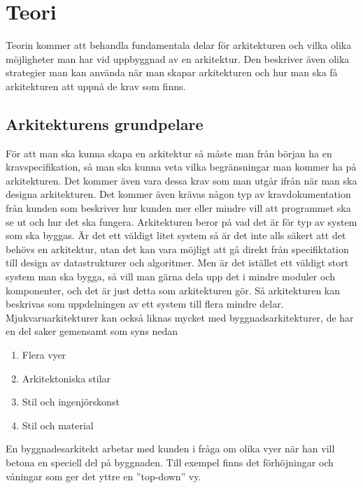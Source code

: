 \section{Teori}
Teorin kommer att behandla fundamentala delar för arkitekturen och vilka olika möjligheter man har vid uppbyggnad av en arkitektur. Den beskriver även olika strategier man kan använda när man skapar arkitekturen och hur man ska få arkitekturen att uppnå de krav som finns.

\subsection{Arkitekturens grundpelare}
För att man ska kunna skapa en arkitektur så måste man från början ha en kravspecifikation, så man ska kunna veta vilka begränsningar man kommer ha på arkitekturen. Det kommer även vara dessa krav som man utgår ifrån när man ska designa arkitekturen. \cite[s. 223]{set}
\newline
\newline
Det kommer även krävas någon typ av kravdokumentation från kunden som beskriver hur kunden mer eller mindre vill att programmet ska se ut och hur det ska fungera. \cite[s. 223]{set}
\newline
\newline
Arkitekturen beror på vad det är för typ av system som ska byggas. Är det ett väldigt litet system så är det inte alls säkert att det behövs en arkitektur, utan det kan vara möjligt att gå direkt från specifiktation till design av datastrukturer och algoritmer. Men är det istället ett väldigt stort system man ska bygga, så vill man gärna dela upp det i mindre moduler och komponenter, och det är just detta som arkitekturen gör. Så arkitekturen kan beskrivas som uppdelningen av ett system till flera mindre delar. \cite[s. 223]{set}
\newline
\newline
Mjukvaruarkitekturer kan också liknas mycket med byggnadsarkitekturer, de har en del saker gemensamt som syns nedan
\begin{enumerate}
	\item Flera vyer
	\item Arkitektoniska stilar
	\item Stil och ingenjörskonst
	\item Stil och material
\end{enumerate}
En byggnadesarkitekt arbetar med kunden i fråga om olika vyer när han vill betona en speciell del på byggnaden. Till exempel finns det förhöjningar och våningar som ger det yttre en ''top-down'' vy. \citep{perry92}

